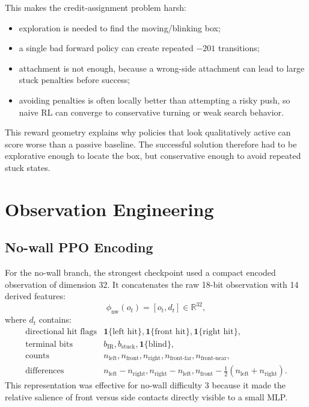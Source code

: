 \documentclass[11pt]{article}
\begin{document}
This makes the credit-assignment problem harsh:
\begin{itemize}
  \item exploration is needed to find the moving/blinking box;
  \item a single bad forward policy can create repeated \(-201\) transitions;
  \item attachment is not enough, because a wrong-side attachment can lead to large
        stuck penalties before success;
  \item avoiding penalties is often locally better than attempting a risky push, so
        naive RL can converge to conservative turning or weak search behavior.
\end{itemize}

This reward geometry explains why policies that look qualitatively active can score
worse than a passive baseline.  The successful solution therefore had to be
explorative enough to locate the box, but conservative enough to avoid repeated
stuck states.

\section{Observation Engineering}

\subsection{No-wall PPO Encoding}

For the no-wall branch, the strongest checkpoint used a compact encoded observation
of dimension 32.  It concatenates the raw 18-bit observation with 14 derived features:
\[
  \phi_{\text{nw}}(o_t) =
  [o_t, d_t] \in \mathbb{R}^{32},
\]
where \(d_t\) contains:
\[
\begin{array}{ll}
\text{directional hit flags} & \mathbf{1}\{\text{left hit}\}, \mathbf{1}\{\text{front hit}\}, \mathbf{1}\{\text{right hit}\},\\
\text{terminal bits} & b_{\text{IR}}, b_{\text{stuck}}, \mathbf{1}\{\text{blind}\},\\
\text{counts} & n_{\text{left}}, n_{\text{front}}, n_{\text{right}}, n_{\text{front-far}}, n_{\text{front-near}},\\
\text{differences} & n_{\text{left}}-n_{\text{right}}, n_{\text{right}}-n_{\text{left}},
n_{\text{front}}-\frac{1}{2}(n_{\text{left}}+n_{\text{right}}).
\end{array}
\]
This representation was effective for no-wall difficulty 3 because it made the
relative salience of front versus side contacts directly visible to a small MLP.
\end{document}
